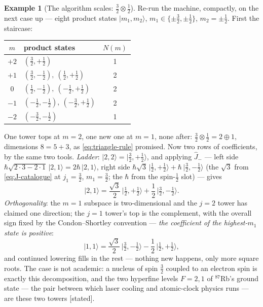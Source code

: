\documentclass[11pt]{article}
\theoremstyle{plain}
\theoremstyle{definition}
\newtheorem{example}[theorem]{Example}
\theoremstyle{remark}
\newcommand{\op}[1]{\hat{#1}}
\newcommand{\ket}[1]{\lvert #1 \rangle}
\begin{document}
\begin{example}[The algorithm scales: $\tfrac32 \otimes \tfrac12$]
\label{ex:three-half}
Re-run the machine, compactly, on the next case up --- eight
product states $\ket{m_1, m_2}$, $m_1 \in \{\pm\tfrac32,
\pm\tfrac12\}$, $m_2 = \pm\tfrac12$. First the staircase:
\begin{center}
\begin{tabular}{c|l|c}
\toprule
$m$ & product states & $N(m)$ \\
\midrule
$+2$ & $(\tfrac32, +\tfrac12)$ & 1 \\
$+1$ & $(\tfrac32, -\tfrac12),\ (\tfrac12, +\tfrac12)$ & 2 \\
$0$ & $(\tfrac12, -\tfrac12),\ (-\tfrac12, +\tfrac12)$ & 2 \\
$-1$ & $(-\tfrac12, -\tfrac12),\ (-\tfrac32, +\tfrac12)$ & 2 \\
$-2$ & $(-\tfrac32, -\tfrac12)$ & 1 \\
\bottomrule
\end{tabular}
\end{center}
One tower tops at $m = 2$, one new one at $m = 1$, none after:
$\tfrac32 \otimes \tfrac12 = 2 \oplus 1$, dimensions $8 = 5 + 3$,
as \eqref{eq:triangle-rule} promised. Now two rows of coefficients,
by the same two tools. \emph{Ladder}: $\ket{2,2} =
\ket{\tfrac32, +\tfrac12}$, and applying $\op J_-$ --- left side
$\hbar\sqrt{2\cdot3 - 2\cdot1}\,\ket{2,1} = 2\hbar\,\ket{2,1}$,
right side $\hbar\sqrt3\,\ket{\tfrac12, +\tfrac12} +
\hbar\,\ket{\tfrac32, -\tfrac12}$ (the $\sqrt3$ from
\eqref{eq:J-catalogue} at $j_1 = \tfrac32$, $m_1 = \tfrac32$;
the $\hbar$ from the spin-$\tfrac12$ slot) --- gives
\begin{equation}
  \ket{2, 1}
  = \frac{\sqrt3}{2}\,\ket{\tfrac12, +\tfrac12}
  + \frac12\,\ket{\tfrac32, -\tfrac12}.
\end{equation}
\emph{Orthogonality}: the $m = 1$ subspace is two-dimensional and
the $j = 2$ tower has claimed one direction; the $j = 1$ tower's
top is the complement, with the overall sign fixed by the
Condon--Shortley convention --- \emph{the coefficient of the
highest-$m_1$ state is positive}:
\begin{equation}
  \ket{1, 1}
  = \frac{\sqrt3}{2}\,\ket{\tfrac32, -\tfrac12}
  - \frac12\,\ket{\tfrac12, +\tfrac12},
\end{equation}
and continued lowering fills in the rest --- nothing new happens,
only more square roots. The case is not academic: a nucleus of spin
$\tfrac32$ coupled to an electron spin is exactly this
decomposition, and the two hyperfine levels $F = 2, 1$ of
$^{87}$Rb's ground state --- the pair between which laser cooling
and atomic-clock physics runs --- are these two towers [stated].
\end{example}
\end{document}
